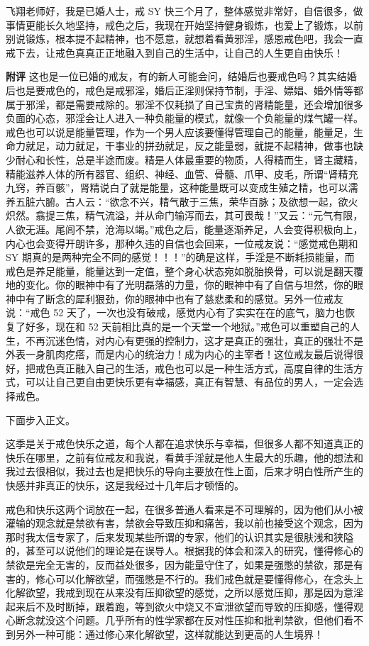 \begin{case}
    飞翔老师好，我是已婚人士，戒 SY 快三个月了，整体感觉非常好，自信很多，做事情更能长久地坚持，戒色之后，我现在开始坚持健身锻炼，也爱上了锻炼，以前别说锻炼，根本提不起精神，也不愿意，就想着看黄邪淫，感恩戒色吧，我会一直戒下去，让戒色真真正正地融入到自己的生活中，让自己的人生更自由快乐！

    \textbf{附评} 这也是一位已婚的戒友，有的新人可能会问，结婚后也要戒色吗？其实结婚后也是要戒色的，戒色是戒邪淫，婚后正淫则保持节制，手淫、嫖娼、婚外情等都属于邪淫，都是需要戒除的。邪淫不仅耗损了自己宝贵的肾精能量，还会增加很多负面的心态，邪淫会让人进入一种负能量的模式，就像一个负能量的煤气罐一样。戒色也可以说是能量管理，作为一个男人应该要懂得管理自己的能量，能量足，生命力就足，动力就足，干事业的拼劲就足，反之能量弱，就提不起精神，做事也缺少耐心和长性，总是半途而废。精是人体最重要的物质，人得精而生，肾主藏精，精能滋养人体的所有器官、组织、神经、血管、骨髓、爪甲、皮毛，所谓“肾精充九窍，养百骸”，肾精说白了就是能量，这种能量既可以变成生殖之精，也可以濡养五脏六腑。古人云：“欲念不兴，精气散于三焦，荣华百脉；及欲想一起，欲火炽然。翕提三焦，精气流溢，并从命门输泻而去，其可畏哉！”又云：“元气有限，人欲无涯。尾闾不禁，沧海以竭。”戒色之后，能量逐渐养足，人会变得积极向上，内心也会变得开朗许多，那种久违的自信也会回来，一位戒友说：“感觉戒色期和 SY 期真的是两种完全不同的感觉！！！”的确是这样，手淫是不断耗损能量，而戒色是养足能量，能量达到一定值，整个身心状态宛如脱胎换骨，可以说是翻天覆地的变化。你的眼神中有了光明磊落的力量，你的眼神中有了自信与坦然，你的眼神中有了断念的犀利狠劲，你的眼神中也有了慈悲柔和的感觉。另外一位戒友说：“戒色 52 天了，一次也没有破戒，感觉内心有了实实在在的底气，脑力也恢复了好多，现在和 52 天前相比真的是一个天堂一个地狱。”戒色可以重塑自己的人生，不再沉迷色情，对内心有更强的控制力，这才是真正的强壮，真正的强壮不是外表一身肌肉疙瘩，而是内心的统治力！成为内心的主宰者！这位戒友最后说得很好，把戒色真正融入自己的生活，戒色也可以是一种生活方式，高度自律的生活方式，可以让自己更自由更快乐更有幸福感，真正有智慧、有品位的男人，一定会选择戒色。
\end{case}

下面步入正文。

这季是关于戒色快乐之道，每个人都在追求快乐与幸福，但很多人都不知道真正的快乐在哪里，之前有位戒友和我说，看黄手淫就是他人生最大的乐趣，他的想法和我过去很相似，我过去也是把快乐的导向主要放在性上面，后来才明白性所产生的快感并非真正的快乐，这是我经过十几年后才顿悟的。

戒色和快乐这两个词放在一起，在很多普通人看来是不可理解的，因为他们从小被灌输的观念就是禁欲有害，禁欲会导致压抑和痛苦，我以前也接受这个观念，因为那时我太信专家了，后来发现某些所谓的专家，他们的认识其实是很肤浅和狭隘的，甚至可以说他们的理论是在误导人。根据我的体会和深入的研究，懂得修心的禁欲是完全无害的，反而益处很多，因为能量守住了，如果是强憋的禁欲，那是有害的，修心可以化解欲望，而强憋是不行的。我们戒色就是要懂得修心，在念头上化解欲望，我戒到现在从来没有压抑欲望的感觉，之所以感觉压抑，那是因为意淫起来后不及时断掉，跟着跑，等到欲火中烧又不宣泄欲望而导致的压抑感，懂得观心断念就没这个问题。几乎所有的性学家都在反对性压抑和批判禁欲，但他们看不到另外一种可能：通过修心来化解欲望，这样就能达到更高的人生境界！

